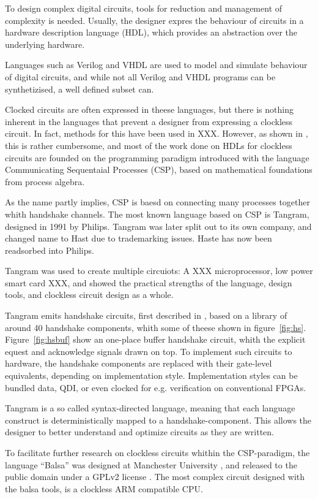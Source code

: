 To design complex digital circuits, tools for reduction and management
of complexity is needed. Usually, the designer expres the behaviour of
circuits in a hardware description language (HDL), which provides an
abstraction over the underlying hardware.

Languages such as Verilog and VHDL are used to model and simulate
behaviour of digital circuits, and while not all Verilog and VHDL
programs can be synthetizised, a well defined subset can.

Clocked circuits are often expressed in theese languages, but there is
nothing inherent in the languages that prevent a designer from
expressing a clockless circuit. In fact, methods for this have been
used in XXX. However, as shown in \cite[pp XXX]{sparso}, this is
rather cumbersome, and most of the work done on HDLs for clockless
circuits are founded on the programming paradigm introduced with the
language Communicating Sequentaial Processes (CSP)\cite{xxx}, based on
mathematical foundations from process algebra.

As the name partly implies, CSP is baesd on connecting many processes
together whith handshake channels. The most known language based on
CSP is Tangram, designed in 1991 by Philips. Tangram was later split
out to its own company, and changed name to Hast due to trademarking
issues. Haste has now been readsorbed into Philips.

Tangram was used to create multiple circuiots: A XXX microprocessor,
low power smart card XXX, and showed the practical strengths of the
language, design tools,  and clockless circuit design as a
whole.

Tangram emits handshake circuits, first described in
\cite{12,teakxxx}, based on a library of around 40 handshake
components, whith some of theese shown in
figure~\ref{fig:hs}. Figure~\ref{fig:hsbuf} show an one-place buffer
handshake circuit, whith the explicit equest and acknowledge signals
drawn on top. To implement such circuits to hardware, the handshake
components are replaced with their gate-level equivalents, depending
on implementation style. Implementation styles can be bundled data,
QDI, or even clocked for e.g. verification on conventional FPGAs.

Tangram is a so called syntax-directed language, meaning that each
language construct is deterministically mapped to a
handshake-component. This allows the designer to better understand and
optimize circuits as they are written.

To facilitate further research on clockless circuits whithin the
CSP-paradigm, the language ``Balsa'' was designed at Manchester
University \cite{xxx}, and released to the public domain under a GPLv2
license \cite{gpl}. The most complex circuit designed with the balsa
tools, is a clockless ARM\cite{arm} compatible CPU\cite{spa}.

